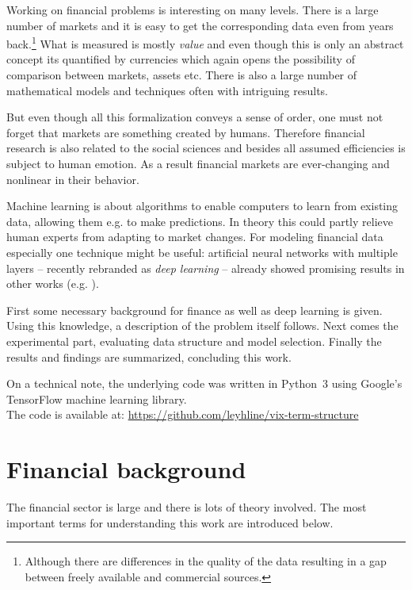 Working on financial problems is interesting on many levels. There is a large number of markets and it is easy to get the corresponding data even from years back.\footnote{%
	Although there are differences in the quality of the data resulting in a gap between freely available and commercial sources.}
What is measured is mostly \emph{value} and even though this is only an abstract concept its quantified by currencies which again opens the possibility of comparison between markets, assets etc.
There is also a large number of mathematical models and techniques often with intriguing results.

But even though all this formalization conveys a sense of order, one must not forget that markets are something created by humans. Therefore financial research is also related to the social sciences and besides all assumed efficiencies is subject to human emotion. As a result financial markets are ever-changing and nonlinear in their behavior.

Machine learning is about algorithms to enable computers to learn from existing data, allowing them e.g. to make predictions. In theory this could partly relieve human experts from adapting to market changes. For modeling financial data especially one technique might be useful: artificial neural networks with multiple layers -- recently rebranded as \emph{deep learning} -- already showed promising results in other works (e.g. \cite{Niaki-2013}).

First some necessary background for finance as well as deep learning is given. Using this knowledge, a description of the problem itself follows. Next comes the experimental part, evaluating data structure and model selection. Finally the results and findings are summarized, concluding this work.

On a technical note, the underlying code was written in Python~3 using Google's TensorFlow machine learning library.\cite{tensorflow2015-whitepaper} \\
The code is available at: \url{https://github.com/leyhline/vix-term-structure}

\section{Financial background}
\label{sec:financial-background}

The financial sector is large and there is lots of theory involved. The most important terms for understanding this work are introduced below.

